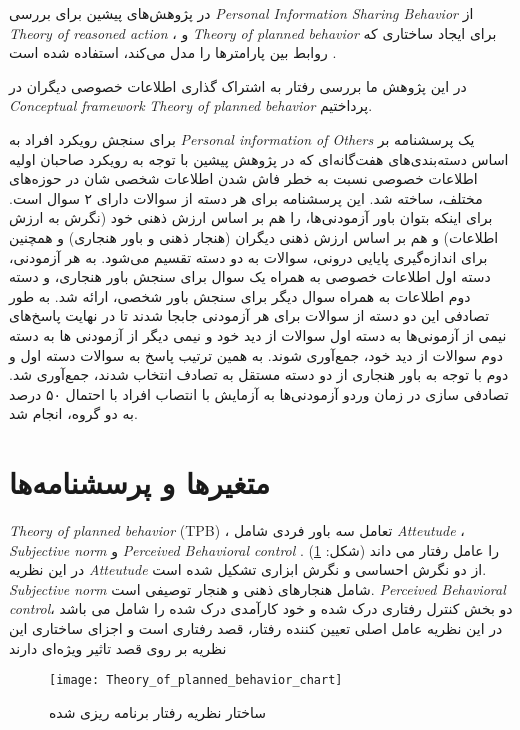 در پژوهش‌های پیشین برای بررسی
\textit{
  \gls{Personal Information Sharing Behavior}
}
از
\textit{
  \gls{Theory of reasoned action}
}
\!\citep{malhotraInternetUsersInformation2004}،
و
\textit{
  \gls{Theory of planned behavior}
}
برای ایجاد ساختاری که روابط بین پارامترها را مدل می‌کند، استفاده شده است
\!\citep{dinevExtendedPrivacyCalculus2006b}.

در این پژوهش ما بررسی رفتار به اشتراک گذاری اطلاعات خصوصی دیگران در
\textit{
  \gls{Conceptual framework}
}
\textit{
  \gls{Theory of planned behavior}
}
پرداختیم.

برای سنجش رویکرد‍ افراد به
\textit{
  \gls{Personal information of Others}
}
یک پرسشنامه بر اساس دسته‌بندی‌های هفت‌گانه‌ای که در پژوهش پیشین با توجه به رویکرد صاحبان
اولیه اطلاعات خصوصی نسبت به خطر فاش شدن اطلاعات شخصی شان در حوزه‌های مختلف، ساخته شد.
این پرسشنامه برای هر دسته از سوالات دارای ۲ سوال است. برای اینکه بتوان باور 
آزمودنی‌ها، را هم بر اساس ارزش ذهنی خود
\!(نگرش به ارزش اطلاعات)
و هم بر اساس ارزش ذهنی دیگران
\!(هنجار ذهنی و باور هنجاری)
و همچنین برای اندازه‌گیری پایایی درونی،
سوالات به دو دسته تقسیم ‌می‌شود.
به هر آزمودنی، دسته اول اطلاعات خصوصی به همراه یک سوال برای سنجش باور هنجاری، و دسته دوم
اطلاعات به همراه سوال دیگر برای سنجش باور شخصی، ارائه شد. به طور تصادفی این دو دسته از 
سوالات برای هر آزمودنی جابجا شدند تا در نهایت پاسخ‌های نیمی از آزمونی‌ها به دسته اول سوالات از دید خود و نیمی 
دیگر از آزمودنی ها به دسته دوم سوالات از دید خود، جمع‌آوری شوند. به همین ترتیب پاسخ به سوالات دسته اول و دوم 
با توجه به باور هنجاری از دو دسته مستقل به تصادف انتخاب شدند، جمع‌آوری شد. تصادفی سازی در زمان وردو آزمودنی‌ها
به آزمایش با انتصاب افراد با احتمال ۵۰ درصد به دو گروه، انجام شد.

\section{متغیر‌ها و پرسشنامه‌ها}

\ifPlennedBahaviorTheory
  \textit{\gls{Theory of planned behavior}}
  \!(TPB)
  ، تعامل سه باور فردی شامل
  \textit{\gls{Atteutude}} ،
  \textit{\gls{Subjective norm}} و
  \textit{\gls{Perceived Behavioral control}}
  را عامل رفتار می داند
  \!(شکل: \ref{fig:Theory_of_planned_behavior_chart})
  \!\cite{ajzenTheoryPlannedBehavior2020}.
  در این نظریه 
  \textit{\gls{Atteutude}}
 از دو نگرش احساسی و نگرش ابزاری تشکیل شده است.
  \textit{\gls{Subjective norm}}
  شامل  هنجارهای ذهنی و هنجار توصیفی است.
  \textit{\gls{Perceived Behavioral control}}،
  دو بخش کنترل رفتاری درک شده و خود کارآمدی درک شده را شامل می باشد
  در این نظریه عامل اصلی تعیین کننده
  رفتار، قصد رفتاری است و اجزای ساختاری این نظریه
  بر روی قصد تاثیر ویژه‌ای دارند
  \cite{mhmdpwrBrrsyTthyrTywry2022}
  \begin{figure}[ht]
    \centerline{\texttt{[image: Theory\_of\_planned\_behavior\_chart]}}
    \caption{ساختار نظریه رفتار برنامه ریزی شده
    }
    \label{fig:Theory_of_planned_behavior_chart}
  \end{figure}\\

